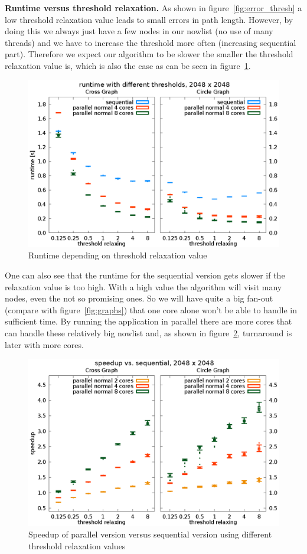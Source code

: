 \documentclass[letterpaper]{article}
\newcommand{\mypar}[1]{{\bf #1.}}
\begin{document}
\mypar{Runtime versus threshold relaxation}
As shown in figure~\ref{fig:error_thresh} a low threshold relaxation value leads to small errors in path length. However, by doing this we always just have a few nodes in our nowlist (no use of many threads) and we have to increase the threshold more often (increasing sequential part). Therefore we expect our algorithm to be slower the smaller the threshold relaxation value is, which is also the case as can be seen in figure~\ref{fig:runtime_thresh}.\\
\begin{figure}[h]\centering
  \includegraphics[scale=0.558]{runtime_threshold.eps}
  \caption{Runtime depending on threshold relaxation value\label{fig:runtime_thresh}}
\end{figure}
One can also see that the runtime for the sequential version gets slower if the relaxation value is too high. With a high value the algorithm will visit many nodes, even the not so promising ones. So we will have quite a big fan-out (compare with figure~\ref{fig:graphs}) that one core alone won't be able to handle in sufficient time. By running the application in parallel there are more cores that can handle these relatively big nowlist and, as shown in figure~\ref{fig:speedup_thresh}, turnaround is later with more cores.
\begin{figure}[h]\centering
  \includegraphics[scale=0.558]{speedup_threshold.eps}
  \caption{Speedup of parallel version versus sequential version using different threshold relaxation values\label{fig:speedup_thresh}}
\end{figure}
\end{document}
